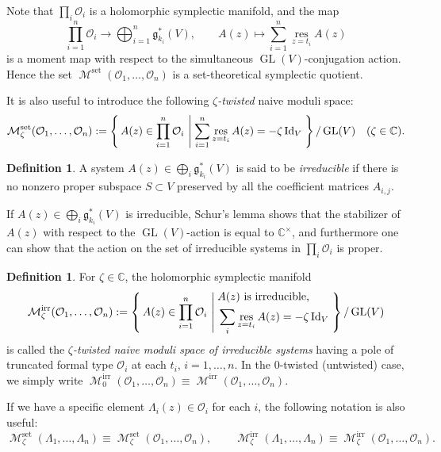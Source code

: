 \documentclass[pdftex]{sigma}
\numberwithin{equation}{section}
\theoremstyle{definition}
\newtheorem{Definition}[Theorem]{Definition}
\newcommand{\C}{\mathbb{C}} %
\newcommand{\GL}{\operatorname{GL}} %
\newcommand{\g}{\mathfrak{g}} %
\newcommand{\unit}{\mathrm{Id}}
\newcommand{\rset}[2]%
{\left\{ \, #1 \, \left| \hspace{0.25em} #2\right. \, \right\} }
\newcommand{\res}{\operatorname*{res}}
\newcommand{\Mirr}{\operatorname{\mathcal{M}}^\mathrm{irr}}
\newcommand{\Mset}{\operatorname{\mathcal{M}}^\mathrm{set}}
\newcommand{\bO}{\mathcal{O}}
\begin{document}
Note that $\prod_i \bO_i$ is a holomorphic symplectic manifold,
and the map
\[
\prod_{i=1}^n \bO_i \to \bigoplus_{i=1}^n \g^*_{k_i}(V), \qquad
A(z) \mapsto \sum_{i=1}^n \res_{z=t_i}A(z)
\]
is a moment map with respect to
the simultaneous $\GL(V)$-conjugation action.
Hence the set $\Mset(\bO_1, \dots , \bO_n)$
is a set-theoretical symplectic quotient.

It is also useful to introduce the following
{\em $\zeta$-twisted} naive moduli space:
\[
\Mset_\zeta(\bO_1, \dots ,\bO_n) :=
\rset{A(z) \in \prod_{i=1}^n \bO_i}%
{\sum_{i=1}^n \res_{z=t_i}A(z)=-\zeta\,\unit_V}/\GL(V)
\quad (\zeta \in \C).
\]


\begin{Definition}\label{dfn:irredsystem}
A system $A(z) \in \bigoplus_i \g^*_{k_i}(V)$
is said to be {\em irreducible} if
there is no nonzero proper subspace $S \subset V$
preserved by all the coef\/f\/icient matrices $A_{i,j}$.
\end{Definition}

If $A(z) \in \bigoplus_i \g^*_{k_i}(V)$ is irreducible,
Schur's lemma shows that
the stabilizer of $A(z)$ with respect to the $\GL(V)$-action
is equal to $\C^\times$,
and furthermore one can show that
the action on the set of irreducible systems in $\prod_i \bO_i$ is proper.

\begin{Definition}
For $\zeta \in \C$,
the holomorphic symplectic manifold
\begin{gather*}
\Mirr_\zeta(\bO_1, \dots, \bO_n) :=
\rset{A(z) \in \prod_{i=1}^n \bO_i}%
{\begin{aligned}
&\text{\rm $A(z)$ is irreducible,} \\
&\sum_i \res_{z=t_i}A(z)=-\zeta\,\unit_V
\end{aligned}
}/\GL(V)
\end{gather*}
is called the {\em $\zeta$-twisted naive moduli space of irreducible systems}
having a pole
of truncated formal type $\bO_i$ at each $t_i$, $i=1,\dots ,n$.
In the $0$-twisted (untwisted) case,
we simply write
$\Mirr_0(\bO_1, \dots ,\bO_n) \equiv \Mirr(\bO_1,\dots ,\bO_n)$.
\end{Definition}

If we have a specif\/ic element $\Lambda_i(z) \in \bO_i$ for each $i$,
the following notation is also useful:
\[
\Mset_\zeta(\Lambda_1, \dots, \Lambda_n) \equiv
\Mset_\zeta(\bO_1, \dots, \bO_n), \qquad
\Mirr_\zeta(\Lambda_1, \dots, \Lambda_n) \equiv
\Mirr_\zeta(\bO_1, \dots, \bO_n).
\]
\end{document}

